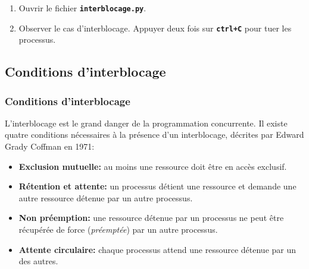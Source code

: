 \documentclass[svgnames,11pt]{beamer}
\begin{document}
\begin{frame}
    \frametitle{}

    \begin{activite}
        \begin{enumerate}
            \item Ouvrir le fichier \textbf{\texttt{interblocage.py}}.
            \item Observer le cas d'interblocage. Appuyer deux fois sur \textbf{\texttt{ctrl+C}} pour tuer les processus.
        \end{enumerate}
    \end{activite}

\end{frame}
\subsection{Conditions d'interblocage}
\begin{frame}
    \frametitle{Conditions d'interblocage}

    L'interblocage est le grand danger de la programmation concurrente. Il existe quatre conditions nécessaires à la présence d'un interblocage, décrites par Edward Grady Coffman en 1971:
    \begin{itemize}
        \item<1-> \textbf{Exclusion mutuelle:} au moins une ressource doit être en accès exclusif.
        \item<2-> \textbf{Rétention et attente:} un processus détient une ressource et demande une autre ressource détenue par un autre processus.
        \item<3-> \textbf{Non préemption:} une ressource détenue par un processus ne peut être récupérée de force (\emph{préemptée}) par un autre processus.
        \item<4-> \textbf{Attente circulaire:} chaque processus attend une ressource détenue par un des autres.
    \end{itemize}

\end{frame}
\end{document}
